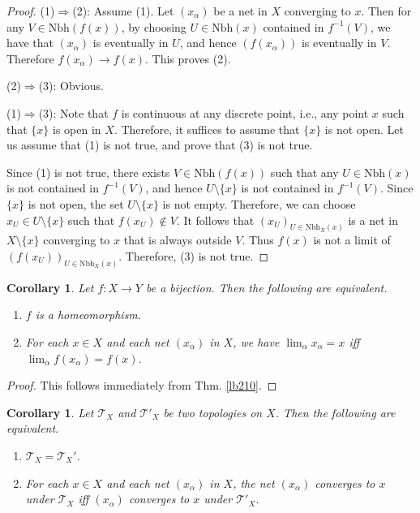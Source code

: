 \documentclass[12pt,b5paper,notitlepage]{article}
\theoremstyle{definition}
\theoremstyle{plain}
\newtheorem{co}[df]{Corollary}
\newcommand{\Nbh}{\mathrm{Nbh}}
\newcommand{\MT}{\mathcal T}
\numberwithin{equation}{section}
\begin{document}
\begin{proof}
(1)$\Rightarrow$(2): Assume (1). Let $(x_\alpha)$ be a net in $X$ converging to $x$. Then for any $V\in\Nbh(f(x))$, by choosing $U\in\Nbh(x)$ contained in $f^{-1}(V)$, we have that $(x_\alpha)$ is eventually in $U$, and hence $(f(x_\alpha))$ is eventually in $V$. Therefore $f(x_\alpha)\rightarrow f(x)$. This proves (2).

(2)$\Rightarrow$(3): Obvious.

(1)$\Rightarrow$(3): Note that $f$ is continuous at any discrete point, i.e., any point $x$ such that $\{x\}$ is open in $X$. Therefore, it suffices to assume that $\{x\}$ is not open. Let us assume that (1) is not true, and prove that (3) is not true.

Since (1) is not true, there exists $V\in\Nbh(f(x))$ such that any $U\in\Nbh(x)$ is not contained in $f^{-1}(V)$, and hence $U\setminus\{x\}$ is not contained in $f^{-1}(V)$. Since $\{x\}$ is not open, the set $U\setminus\{x\}$ is not empty. Therefore, we can choose $x_U\in U\setminus\{x\}$ such that $f(x_U)\notin V$. It follows that $(x_U)_{U\in\Nbh_X(x)}$ is a net in $X\setminus\{x\}$ converging to $x$ that is always outside $V$. Thus $f(x)$ is not a limit of $(f(x_U))_{U\in\Nbh_X(x)}$. Therefore, (3) is not true.
\end{proof}


\begin{co}\label{lb211}
Let $f:X\rightarrow Y$ be a bijection. Then the following are equivalent.
\begin{enumerate}
\item[(1)] $f$ is a homeomorphism.
\item[(2)] For each $x\in X$ and each net $(x_\alpha)$ in $X$, we have $\lim_\alpha x_\alpha=x$ iff $\lim_\alpha f(x_\alpha)=f(x)$. 
\end{enumerate}
\end{co}

\begin{proof}
This follows immediately from Thm. \ref{lb210}.
\end{proof}

\begin{co}\label{lb212}
Let $\MT_X$ and $\MT'_X$ be two topologies on $X$. Then the following are equivalent.
\begin{enumerate}
\item[(1)] $\MT_X=\MT_X'$.
\item[(2)] For each $x\in X$ and each net $(x_\alpha)$ in $X$, the net $(x_\alpha)$ converges to $x$ under $\MT_X$ iff $(x_\alpha)$ converges to $x$ under $\MT'_X$. 
\end{enumerate}
\end{co}
\end{document}
